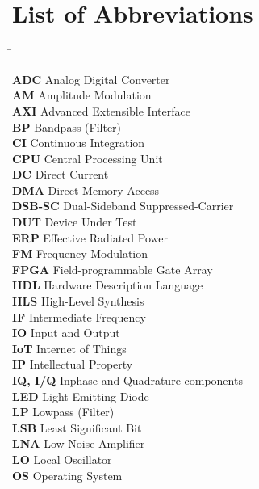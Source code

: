 \chapter{List of Abbreviations}
\label{cha:listabbrev}

\begin{tabbing}
\hspace{25 mm}\=\kill

\textbf{ADC}       \> Analog Digital Converter\\
\textbf{AM}        \> Amplitude Modulation\\
\textbf{AXI}       \> Advanced Extensible Interface\\
\textbf{BP}        \> Bandpass (Filter)\\
\textbf{CI}        \> Continuous Integration\\
\textbf{CPU}       \> Central Processing Unit\\
\textbf{DC}        \> Direct Current\\
\textbf{DMA}       \> Direct Memory Access\\
\textbf{DSB-SC}    \> Dual-Sideband Suppressed-Carrier\\
\textbf{DUT}       \> Device Under Test\\
\textbf{ERP}       \> Effective Radiated Power\\
\textbf{FM}        \> Frequency Modulation\\
\textbf{FPGA}      \> Field-programmable Gate Array\\
\textbf{HDL}       \> Hardware Description Language\\
\textbf{HLS}       \> High-Level Synthesis\\
\textbf{IF}        \> Intermediate Frequency\\
\textbf{IO}        \> Input and Output\\
\textbf{IoT}       \> Internet of Things\\
\textbf{IP}        \> Intellectual Property\\
\textbf{IQ, I/Q}   \> Inphase and Quadrature components\\
\textbf{LED}       \> Light Emitting Diode\\
\textbf{LP}        \> Lowpass (Filter)\\
\textbf{LSB}       \> Least Significant Bit\\
\textbf{LNA}       \> Low Noise Amplifier\\
\textbf{LO}        \> Local Oscillator\\
\textbf{OS}        \> Operating System\\

\end{tabbing}
